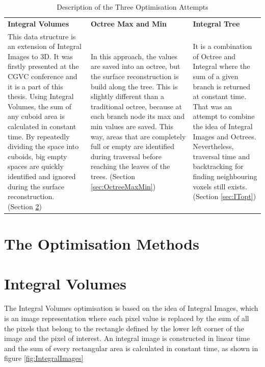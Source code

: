 \documentclass{subfiles}
\begin{document}
\begin{table}[!htbp]
	\renewcommand{\arraystretch}{1.3}
	
	\centering
	\begin{tabular}{|P{0.3\textwidth}|P{0.3\textwidth}|P{0.3\textwidth}|}	
		\hline
		\textbf{Integral Volumes} &	\textbf{Octree Max and Min} & \textbf{Integral Tree}  \\
		\hlinewd{1.5pt}
		{\color{blue} This data structure is an extension of Integral Images to 3D. It was firstly presented at the CGVC conference and it is a part of this thesis. Using Integral Volumes, the sum of any cuboid area is calculated in constant time. By repeatedly dividing the space into cuboids, big empty spaces are quickly identified and ignored during the surface reconstruction. \newline(Section \ref{sec:IVopt}) }&	{\color{blue}In this approach, the values are saved into an octree, but the surface reconstruction is build along the tree. This is slightly different than a traditional octree, because at each branch node its max and min values are saved. This way, areas that are completely full or empty are identified during traversal before reaching the leaves of the trees. (Section \ref{sec:OctreeMaxMin}) } &{\color{blue} It is a combination of Octree and Integral where the sum of a given branch is returned at constant time. That was an attempt to combine the idea of Integral Images and Octrees. Nevertheless, traversal time and backtracking for finding neighbouring voxels still exists. (Section \ref{sec:ITopt})}\\	
		\hline
	\end{tabular}
	\caption{Description of the Three Optimisation Attempts}
	\label{tab:DataStructuresOptimised}
\end{table}

\newpage
\section{The Optimisation Methods}\label{sec:Opt:Methods}

\section{Integral Volumes}\label{sec:IVopt}
The Integral Volumes optimisation is based on the idea of Integral Images, which is an image representation where each pixel value is replaced by the sum of all the pixels that belong to the rectangle defined by the lower left corner of the image and the pixel of interest.  An integral image is constructed in linear time and the sum of every rectangular area is calculated in constant time, as shown in figure \ref{fig:IntegralImages} \cite{Crow1984}
\end{document}
